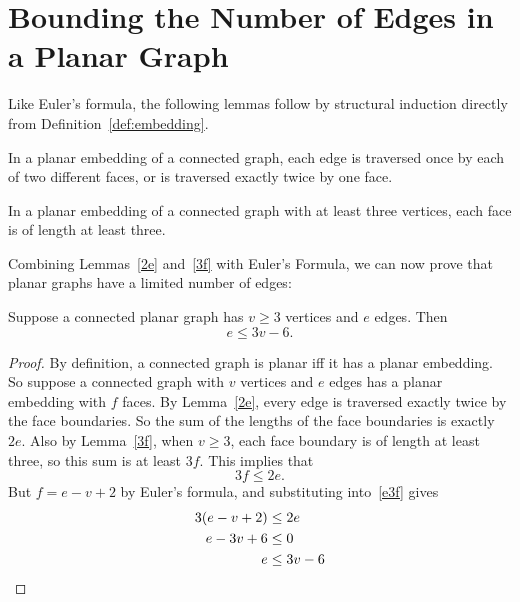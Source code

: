\section{Bounding the Number of Edges in a Planar Graph}

Like Euler's formula, the following lemmas follow by structural induction
directly from Definition~\ref{def:embedding}.

\begin{lemma}\label{2e}
In a planar embedding of a connected graph, each edge is traversed once by
each of two different faces, or is traversed exactly twice by one face.
\end{lemma}

\begin{lemma}\label{3f}
  In a planar embedding of a connected graph with at least three vertices,
  each face is of length at least three.
\end{lemma}

Combining Lemmas~\ref{2e} and~\ref{3f} with Euler's Formula, we can
now prove that planar graphs have a limited number of edges:

\begin{theorem}\label{th:e3v}
  Suppose a connected planar graph has $v \geq 3$ vertices and $e$
  edges.  Then
\begin{equation}\label{eq:e3v}
    e \leq 3v-6.
\end{equation}
\end{theorem}

\begin{proof}
By definition, a connected graph is planar iff it has a planar embedding.
So suppose a connected graph with $v$ vertices and $e$ edges has a planar
embedding with $f$ faces.  By Lemma~\ref{2e}, every edge is traversed
exactly twice by the face boundaries.  So the sum of the lengths of the
face boundaries is exactly $2e$.  Also by Lemma~\ref{3f}, when $v \geq 3$,
each face boundary is of length at least three, so this sum is at least
$3f$.  This implies that
\begin{equation}\label{e3f}
3f \leq 2e.
\end{equation}
But $f = e-v+2$ by Euler's formula, and substituting into~\eqref{e3f} gives
\begin{align*}
3(e-v+2) & \leq 2e\\
e-3v + 6  & \leq 0\\
e & \leq 3v - 6 \qedhere
\end{align*}
\end{proof}

